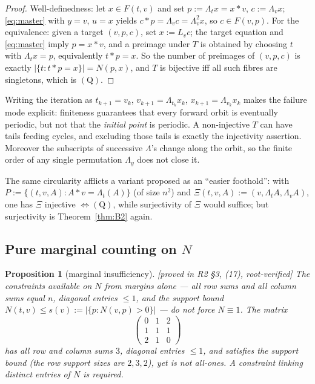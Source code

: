 \documentclass[11pt]{article}
\theoremstyle{plain}
\newtheorem{proposition}[theorem]{Proposition}
\theoremstyle{definition}
\theoremstyle{remark}
\numberwithin{equation}{section}
\newcommand{\op}{\mathbin{*}}
\newcommand{\statusbox}[1]{{\small\sloppy\textsf{[#1]}}}
\newcommand{\PROVED}[1]{\statusbox{proved in #1, root-verified}}
\begin{document}
\begin{proof}
Well-definedness: let $x\in F(t,v)$ and set $p := \Lambda_tx = x\op v$, $c := \Lambda_v x$;
\eqref{eq:master} with $y=v$, $u=x$ yields $c\op p = \Lambda_v c = \Lambda_v^2 x$, so
$c\in F(v,p)$. For the equivalence: given a target $(v,p,c)$, set $x := L_vc$; the target
equation and \eqref{eq:master} imply $p = x\op v$, and a preimage under $T$ is obtained by
choosing $t$ with $\Lambda_t x = p$, equivalently $t\op p = x$. So the number of preimages of
$(v,p,c)$ is exactly $|\{t : t\op p = x\}| = N(p,x)$, and $T$ is bijective iff all such fibres
are singletons, which is $(\mathrm{Q})$.
\end{proof}

Writing the iteration as $t_{k+1} = v_k$, $v_{k+1} = \Lambda_{t_k}x_k$,
$x_{k+1} = \Lambda_{v_k}x_k$ makes the failure mode explicit: finiteness guarantees that every
forward orbit is eventually periodic, but not that the \emph{initial point} is periodic. A
non-injective $T$ can have tails feeding cycles, and excluding those tails is exactly the
injectivity assertion. Moreover the subscripts of successive $\Lambda$'s change along the
orbit, so the finite order of any single permutation $\Lambda_y$ does not close it.

The same circularity afflicts a variant proposed as an ``easier foothold'': with
$P := \{(t,v,A) : A\op v = \Lambda_t(A)\}$ (of size $n^2$) and
$\Xi(t,v,A) := (v,\Lambda_t A,\Lambda_v A)$, one has $\Xi$ injective $\iff (\mathrm{Q})$,
while surjectivity of $\Xi$ would suffice; but surjectivity is Theorem~\ref{thm:B2} again.

\subsection{Pure marginal counting on $N$}\label{sec:blockmarginal}

\begin{proposition}[marginal insufficiency]\label{prop:B3}
\PROVED{R2 \S3, (17)}
The constraints available on $N$ from margins alone --- all row sums and all column sums equal
$n$, diagonal entries $\le 1$, and the support bound $N(t,v)\le s(v) := |\{p : N(v,p)>0\}|$
--- do not force $N\equiv 1$. The matrix
\[
  \begin{pmatrix} 0&1&2\\ 1&1&1\\ 2&1&0 \end{pmatrix}
\]
has all row and column sums $3$, diagonal entries $\le 1$, and satisfies the support bound
(the row support sizes are $2,3,2$), yet is not all-ones. \emph{A constraint linking distinct
entries of $N$ is required.}
\end{proposition}
\end{document}
